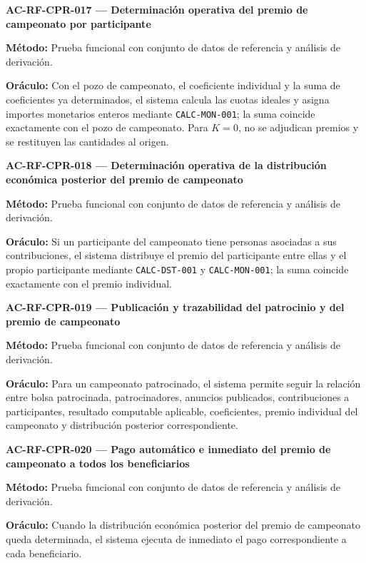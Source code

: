 \documentclass[10pt,letterpaper]{article}
\begin{document}
\noindent\textbf{AC-RF-CPR-017 --- Determinación operativa del premio de campeonato por participante}\par
\textbf{Método:} Prueba funcional con conjunto de datos de referencia y análisis de derivación.\par
\textbf{Oráculo:} Con el pozo de campeonato, el coeficiente individual y la suma de coeficientes ya determinados, el sistema calcula las cuotas ideales y asigna importes monetarios enteros mediante \texttt{CALC-MON-001}; la suma coincide exactamente con el pozo de campeonato. Para $K=0$, no se adjudican premios y se restituyen las cantidades al origen.\par\vspace{0.45em}
\noindent\textbf{AC-RF-CPR-018 --- Determinación operativa de la distribución económica posterior del premio de campeonato}\par
\textbf{Método:} Prueba funcional con conjunto de datos de referencia y análisis de derivación.\par
\textbf{Oráculo:} Si un participante del campeonato tiene personas asociadas a sus contribuciones, el sistema distribuye el premio del participante entre ellas y el propio participante mediante \texttt{CALC-DST-001} y \texttt{CALC-MON-001}; la suma coincide exactamente con el premio individual.\par\vspace{0.45em}
\noindent\textbf{AC-RF-CPR-019 --- Publicación y trazabilidad del patrocinio y del premio de campeonato}\par
\textbf{Método:} Prueba funcional con conjunto de datos de referencia y análisis de derivación.\par
\textbf{Oráculo:} Para un campeonato patrocinado, el sistema permite seguir la relación entre bolsa patrocinada, patrocinadores, anuncios publicados, contribuciones a participantes, resultado computable aplicable, coeficientes, premio individual del campeonato y distribución posterior correspondiente.\par\vspace{0.45em}
\noindent\textbf{AC-RF-CPR-020 --- Pago automático e inmediato del premio de campeonato a todos los beneficiarios}\par
\textbf{Método:} Prueba funcional con conjunto de datos de referencia y análisis de derivación.\par
\textbf{Oráculo:} Cuando la distribución económica posterior del premio de campeonato queda determinada, el sistema ejecuta de inmediato el pago correspondiente a cada beneficiario.\par\vspace{0.45em}
\end{document}
